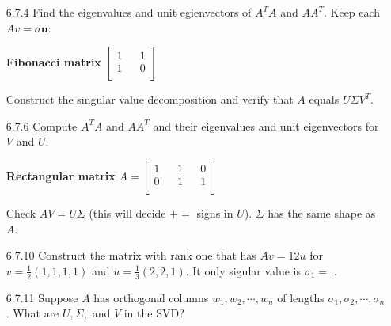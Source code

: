 \documentclass[10pt,twoside,reqno]{article}
\begin{document}
\begin{enumerate}
\item[6.7.4] Find the eigenvalues and unit egienvectors of $A^TA$ and $AA^T$. Keep each $Av = \sigma \pmb{u}$:\\
\begin{center}
\textbf{Fibonacci matrix} 
$
$$
\begin{bmatrix}
1 && 1\\
1 && 0 \\
\end{bmatrix}
$$
$\\
\end{center}
Construct the singular value decomposition and verify that $A$ equals $U \Sigma V^T$.\\


\vspace{3mm}

\item[6.7.6] Compute $A^TA$ and $AA^T$ and their eigenvalues and unit eigenvectors for $V$ and $U$.\\
\begin{center}
\textbf{Rectangular matrix}
$
$$
A =
\begin{bmatrix}
1 && 1 && 0\\
0 && 1 && 1\\
\end{bmatrix}
$$
$\\
\end{center}
Check $AV = U \Sigma$ (this will decide $+=$ signs in $U$). $\Sigma$ has the same shape as $A$.


\vspace{3mm}
\item[6.7.10] Construct the matrix with rank one that has $Av = 12u$ for $v = \frac{1}{2}(1, 1, 1, 1)$ and $u = \frac{1}{3}(2, 2, 1)$. It only sigular value is $\sigma_1 = $ \underline{\hspace{7mm}}.\\


\vspace{3mm}
\item[6.7.11] Suppose $A$ has orthogonal columns $w_1, w_2, \cdots , w_n$ of lengths $\sigma_1, \sigma_2, \cdots, \sigma_n$. What are $U, \Sigma,$ and $V$ in the SVD?\\


\vspace{3mm}
\end{enumerate}
\end{document}
